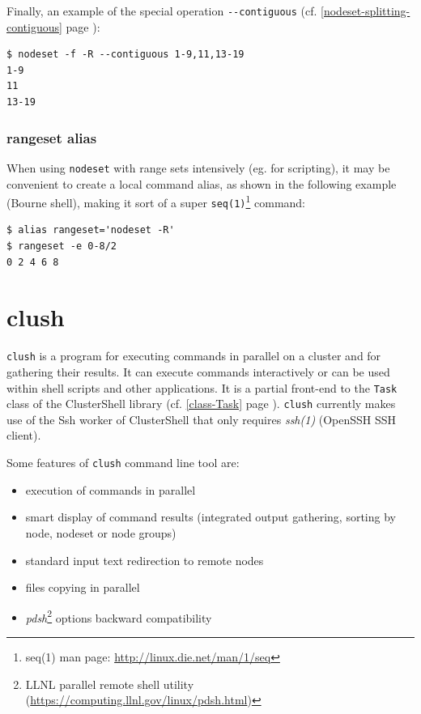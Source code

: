 \documentclass[english,a4paper]{csuserguide}
\newcommand{\clush}{\texttt{clush}\xspace}
\begin{document}
Finally, an example of the special operation \verb+--contiguous+ (cf. \ref{nodeset-splitting-contiguous} page \pageref{nodeset-splitting-contiguous}):
\medskip
\begin{lstlisting}[breaklines=true, breakatwhitespace=true]
$ nodeset -f -R --contiguous 1-9,11,13-19
1-9
11
13-19
\end{lstlisting}

\subsubsection{rangeset alias}
When using  \lstinline+nodeset+ with range sets intensively (eg. for scripting), it may be convenient to create a local command alias, as shown in the following example (Bourne shell), making it sort of a super \verb+seq(1)+\footnote{seq(1) man page: \url{http://linux.die.net/man/1/seq}} command:
\medskip
\begin{lstlisting}[breaklines=true, breakatwhitespace=true]
$ alias rangeset='nodeset -R'
$ rangeset -e 0-8/2
0 2 4 6 8
\end{lstlisting}


\newpage
\section{clush}


\clush is a program for executing commands in parallel on a cluster and for gathering their results. It can execute commands interactively or can be used within shell scripts and other applications. It is a partial front-end to the \verb+Task+ class of the ClusterShell library (cf. \ref{class-Task} page \pageref{class-Task}).  \clush currently makes use of the Ssh worker of ClusterShell that only requires \textit{ssh(1)} (OpenSSH SSH client).

Some features of \clush command line tool are:
\begin{itemize}
\item{execution of commands in parallel}
\item{smart display of command results (integrated output gathering, sorting by node, nodeset or node groups)}
\item{standard input text redirection to remote nodes}
\item{files copying in parallel}
\item{\textit{pdsh}\footnote{LLNL parallel remote shell utility (\url{https://computing.llnl.gov/linux/pdsh.html})} options backward compatibility}
\end{itemize}
\end{document}
